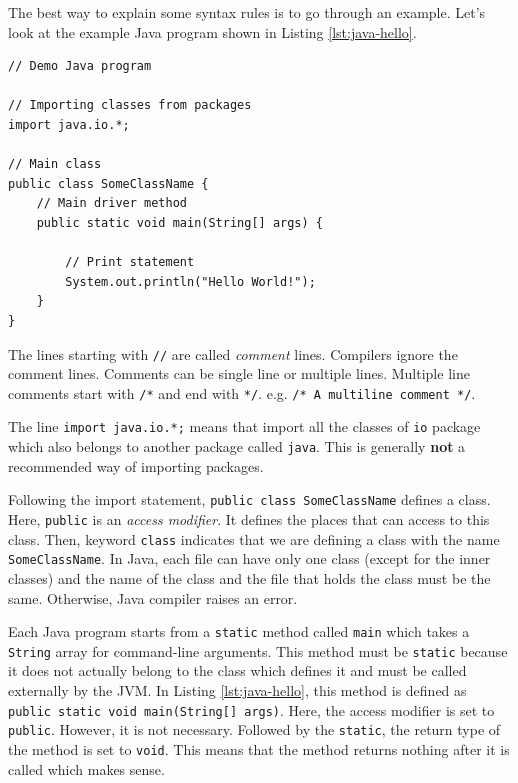 The best way to explain some syntax rules is to go through an example. Let's look at the example Java program shown in Listing \ref{lst:java-hello}.

\begin{lstlisting}[caption={Hello world example written in Java.},label=lst:java-hello]
// Demo Java program

// Importing classes from packages
import java.io.*;

// Main class
public class SomeClassName {
    // Main driver method
    public static void main(String[] args) {

        // Print statement
        System.out.println("Hello World!");
    }
}
\end{lstlisting}

The lines starting with \lstinline!//! are called \emph{comment} lines. Compilers ignore the comment lines. Comments can be single line or multiple lines. Multiple line comments start with \verb|/*| and end with \verb|*/|. e.g. \verb|/* A multiline comment */|.

The line \lstinline!import java.io.*;! means that import all the classes of \lstinline!io! package which also belongs to another package called \lstinline!java!. This is generally \textbf{not} a recommended way of importing packages.

Following the import statement, \lstinline!public class SomeClassName! defines a class. Here, \lstinline!public! is an \emph{access modifier}. It defines the places that can access to this class. Then, keyword \lstinline!class! indicates that we are defining a class with the name \lstinline!SomeClassName!. In Java, each file can have only one class (except for the inner classes) and the name of the class and the file that holds the class must be the same. Otherwise, Java compiler raises an error.

Each Java program starts from a \lstinline!static! method called \lstinline|main| which takes a \lstinline|String| array for command-line arguments. This method must be \lstinline|static| because it does not actually belong to the class which defines it and must be called externally by the JVM. In Listing \ref{lst:java-hello}, this method is defined as \lstinline!public static void main(String[] args)!. Here, the access modifier is set to \lstinline|public|. However, it is not necessary. Followed by the \lstinline|static|, the return type of the method is set to \lstinline|void|. This means that the method returns nothing after it is called which makes sense.

